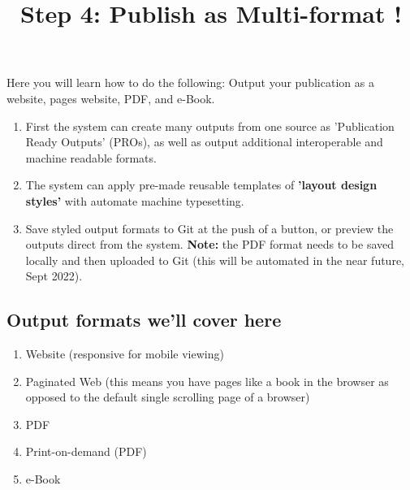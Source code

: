 \documentclass{article}
\begin{document}
\title{Step 4: Publish as Multi-format !}

\maketitle


Here you will learn how to do the following: Output your publication as a website, pages website, PDF, and e-Book.

\begin{enumerate}
\item First the system can create many outputs from one source as 'Publication Ready Outputs' (PROs)\protect\footnotemark{}, as well as output additional interoperable and machine readable formats. 


\item The system can apply pre-made reusable templates of \textbf{'layout design styles'} with automate machine typesetting.


\item Save styled output formats to Git at the push of a button, or preview the outputs direct from the system. \textbf{Note:} the PDF format needs to be saved locally and then uploaded to Git (this will be automated in the near future, Sept 2022).


\end{enumerate}\addtocounter{footnote}{-1}

\subsection{Output formats we'll cover here}\label{H6462932}


\begin{enumerate}
\item Website (responsive for mobile viewing)


\item Paginated Web (this means you have pages like a book in the browser as opposed to the default single scrolling page of a browser)


\item PDF


\item Print-on-demand (PDF)


\item e-Book


\end{enumerate}
\end{document}
